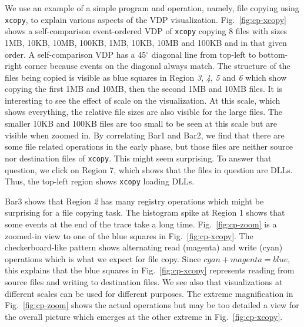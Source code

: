 We use an example of a simple program and operation,
namely, file copying using {\tt xcopy}, to explain various
aspects of the VDP visualization.
Fig.~\ref{fig:cp-xcopy} shows a self-comparison event-ordered VDP of
{\tt xcopy} copying 8 files with sizes
1MB, 10KB, 10MB, 100KB, 1MB, 10KB, 10MB and 100KB and in that given order.
A self-comparison VDP has a 45$^\circ$ diagonal line from top-left to 
bottom-right corner because events on the diagonal always match.
The structure of the files being copied is visible as blue squares in
Region {\em 3}, {\em 4}, {\em 5} and {\em 6} which show copying the
first 1MB and 10MB, then the second 1MB and 10MB files.
It is interesting to see the effect of scale on the visualization.
At this scale, which shows everything, the relative file sizes are also
visible for the large files.  The smaller 10KB and 100KB files are 
too small to be seen at this scale but are visible when zoomed in.
By correlating Bar1 and Bar2,
we find that there are some file related operations in the early phase,
but those files are neither source nor destination files of {\tt xcopy}.
This might seem surprising. To answer that question, we
click on Region 7, which shows that
the files in question are DLLs. Thus, the top-left region 
shows {\tt xcopy} loading DLLs.

Bar3 shows that Region {\em 2} has many registry operations which might
be surprising for a file copying task.
The histogram spike at Region 1 shows that some events at the end of the
trace take a long time.
Fig.~\ref{fig:cp-zoom} is a zoomed-in view to one of the blue squares in
Fig.~\ref{fig:cp-xcopy}.
The checkerboard-like pattern shows alternating read (magenta) and write
(cyan) operations which is what we expect for file copy.
Since $cyan+magenta=blue$,
this explains that the blue squares in Fig.~\ref{fig:cp-xcopy} represents
reading from source files and writing to destination files.
We see also that visualizations at different scales can be used for
different purposes.
The extreme magnification in Fig.~\ref{fig:cp-zoom}
shows the actual operations but may be too detailed a view for
the overall picture which emerges at the other extreme in 
Fig.~\ref{fig:cp-xcopy}.

